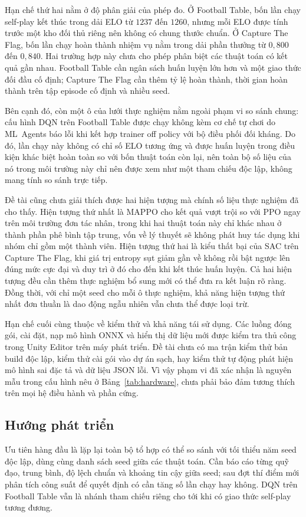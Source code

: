 \indent Hạn chế thứ hai nằm ở độ phân giải của phép đo. Ở Football Table, bốn lần chạy
self-play kết thúc trong dải ELO từ $1237$ đến $1260$, nhưng mỗi ELO được tính trước một
kho đối thủ riêng nên không có chung thước chuẩn. Ở Capture The Flag, bốn lần chạy hoàn
thành nhiệm vụ nằm trong dải phần thưởng từ $0{,}800$ đến $0{,}840$. Hai trường hợp này
chưa cho phép phân biệt các thuật toán có kết quả gần nhau. Football Table cần ngân sách
huấn luyện lớn hơn và một giao thức đối đầu cố định; Capture The Flag cần thêm tỷ lệ hoàn
thành, thời gian hoàn thành trên tập episode cố định và nhiều seed.

\indent Bên cạnh đó, còn một ô của lưới thực nghiệm nằm ngoài phạm vi so sánh chung: cấu
hình DQN trên Football Table được chạy không kèm cơ chế tự chơi do ML~Agents báo lỗi khi
kết hợp trainer off policy với bộ điều phối đối kháng. Do đó, lần chạy này không có chỉ số
ELO tương ứng và được huấn luyện trong điều kiện khác biệt hoàn toàn so với bốn thuật toán
còn lại, nên toàn bộ số liệu của nó trong môi trường này chỉ nên được xem như một tham
chiếu độc lập, không mang tính so sánh trực tiếp.

\indent Đề tài cũng chưa giải thích được hai hiện tượng mà chính số liệu thực nghiệm
đã cho thấy. Hiện tượng thứ nhất là MAPPO cho kết quả vượt trội so với PPO ngay trên môi
trường đơn tác nhân, trong khi hai thuật toán này chỉ khác nhau ở thành phần phê bình tập
trung, vốn về lý thuyết sẽ không phát huy tác dụng khi nhóm chỉ gồm một thành viên. Hiện
tượng thứ hai là kiểu thất bại của SAC trên Capture The Flag, khi giá trị entropy sụt giảm
gần về không rồi bật ngược lên đúng mức cực đại và duy trì ở đó cho đến khi kết thúc huấn
luyện. Cả hai hiện tượng đều cần thêm thực nghiệm bổ sung mới có thể đưa ra kết luận rõ
ràng. Đồng thời, với chỉ một seed cho mỗi ô thực nghiệm, khả năng hiện tượng thứ nhất
đơn thuần là dao động ngẫu nhiên vẫn chưa thể được loại trừ.

\indent Hạn chế cuối cùng thuộc về kiểm thử và khả năng tái sử dụng. Các luồng đóng gói,
cài đặt, nạp mô hình ONNX và hiển thị dữ liệu mới được kiểm tra thủ công trong Unity
Editor trên máy phát triển. Đề tài chưa có ma trận kiểm thử bản build độc lập, kiểm thử cài
gói vào dự án sạch, hay kiểm thử tự động phát hiện mô hình sai đặc tả và dữ liệu JSON lỗi.
Vì vậy phạm vi đã xác nhận là nguyên mẫu trong cấu hình nêu ở Bảng~\ref{tab:hardware}, chưa
phải bảo đảm tương thích trên mọi hệ điều hành và phần cứng.

\subsection{Hướng phát triển}
\indent Ưu tiên hàng đầu là lặp lại toàn bộ tổ hợp có thể so sánh với tối thiểu năm seed
độc lập, dùng cùng danh sách seed giữa các thuật toán. Cần báo cáo từng quỹ đạo, trung bình,
độ lệch chuẩn và khoảng tin cậy giữa seed; sau đợt thí điểm mới phân tích công suất để quyết
định có cần tăng số lần chạy hay không. DQN trên Football Table vẫn là nhánh tham chiếu riêng
cho tới khi có giao thức self-play tương đương.

